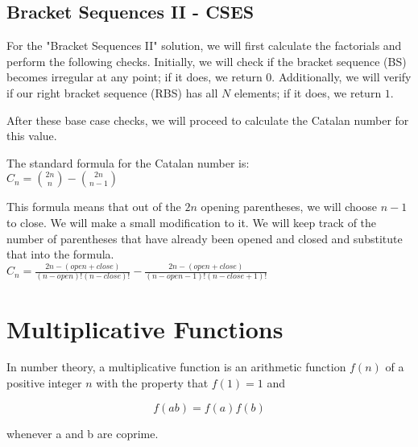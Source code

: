         \subsection{Bracket Sequences II - CSES}
            \tab For the "Bracket Sequences II" solution, we will first calculate the factorials and perform the following checks. Initially, we will check if the bracket sequence (BS) becomes irregular at any point; if it does, we return $0$. Additionally, we will verify if our right bracket sequence (RBS) has all $N$ elements; if it does, we return $1$.

            After these base case checks, we will proceed to calculate the Catalan number for this value.
 
            The standard formula for the Catalan number is: \\

            $C_n = \binom{2n}{n} - \binom{2n}{n - 1}$

            This formula means that out of the $2n$ opening parentheses, we will choose $n - 1$ to close. We will make a small modification to it. We will keep track of the number of parentheses that have already been opened and closed and substitute that into the formula. \\

            $C_n = \frac{2n - (open + close)}{(n-open)!(n-close)!} - \frac{2n - (open + close)}{(n-open-1)!(n-close+1)!}$
    \section{Multiplicative Functions}
        \tab In number theory, a multiplicative function is an arithmetic function $f(n)$ of a positive integer $n$ with the property that $f(1) = 1$ and

        $$\displaystyle f(ab)=f(a)f(b)$$

        whenever a and b are coprime.

